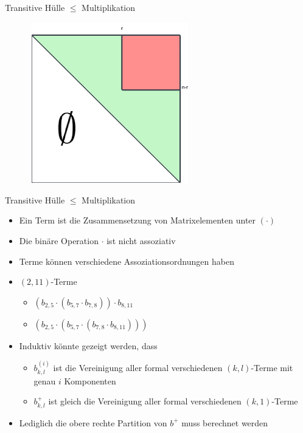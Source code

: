 \documentclass{beamer}
\begin{document}
	\begin{frame}{Transitive Hülle $\le$ Multiplikation}
		\begin{figure}
			\centering
			\includegraphics[width=7cm,height=7cm]{img/LGV1}
		\end{figure}
	\end{frame}

	\begin{frame}{Transitive Hülle $\le$ Multiplikation}
		\begin{itemize}
			\item Ein Term ist die Zusammensetzung von Matrixelementen unter $(\cdot)$
			\item Die binäre Operation $\cdot$ ist nicht assoziativ
			\item Terme können verschiedene Assoziationsordnungen haben
			\item $(2, 11)$-Terme
			\begin{itemize}
				\item $(b_{2,5}\cdot (b_{5,7}\cdot b_{7,8}))\cdot b_{8,11}$
				\item $(b_{2,5}\cdot (b_{5,7}\cdot (b_{7,8}\cdot b_{8,11})))$
			\end{itemize}
			\pause
			\item Induktiv könnte gezeigt werden, dass
			\begin{itemize}
				\item $b_{k,l}^{(i)}$ ist die Vereinigung aller formal verschiedenen $(k,l)$-Terme mit genau $i$ Komponenten
				\item $b_{k,l}^+$ ist gleich die Vereinigung aller formal verschiedenen $(k, 1)$-Terme
			\end{itemize}
			\item Lediglich die obere rechte Partition von $b^+$ muss berechnet werden
			 
		\end{itemize}
	\end{frame}
	
\end{document}

